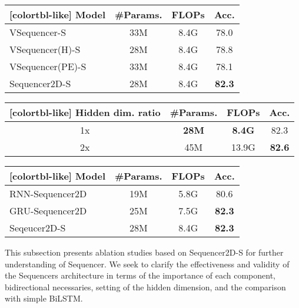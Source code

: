 \documentclass{article}
\begin{document}
\begin{table}[tb]
\begin{minipage}[t]{0.45\linewidth}
{
\setlength\tabcolsep{2.36pt}
\begin{center}
\begin{NiceTabular}{lccc}[colortbl-like]
    Model & \#Params. & FLOPs & Acc. \\
\hline
VSequencer-S & 33M & 8.4G & 78.0 \\
VSequencer(H)-S & 28M & 8.4G & 78.8 \\
VSequencer(PE)-S & 33M & 8.4G & 78.1 \\
Sequencer2D-S & 28M & 8.4G & \textbf{82.3} \\
\end{NiceTabular}
\end{center}
}
\end{minipage}
\begin{minipage}[t]{0.45\linewidth}{
\setlength\tabcolsep{2.36pt}
\begin{center}
\begin{NiceTabular}{cccc}[colortbl-like]
Hidden dim. ratio & \#Params. & FLOPs & Acc. \\
\hline
{}1x & \textbf{28M} & \textbf{8.4G} & 82.3 \\
2x & 45M & 13.9G & \textbf{82.6} \\
\end{NiceTabular}
\end{center}
}\end{minipage}
\begin{minipage}[t]{0.43\linewidth}{
\setlength\tabcolsep{2.36pt}
\begin{center}
\begin{NiceTabular}{lccc}[colortbl-like]
Model & \#Params. & FLOPs & Acc. \\
\hline
RNN-Sequencer2D & 19M & 5.8G & 80.6 \\
GRU-Sequencer2D & 25M & 7.5G & \textbf{82.3} \\
Seqeucer2D-S & 28M & 8.4G & \textbf{82.3} \\
\end{NiceTabular}
\end{center}
}\end{minipage}
\label{table:ablations}
\end{table}

This subsection presents ablation studies based on Sequencer2D-S for further understanding of Sequencer. We seek to clarify the effectiveness and validity of the Sequencers architecture in terms of the importance of each component, bidirectional necessaries, setting of the hidden dimension, and the comparison with simple BiLSTM.
\end{document}
